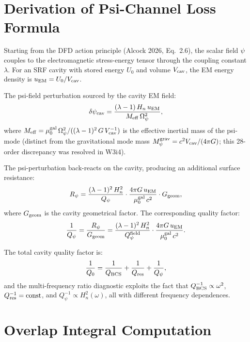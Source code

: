 \documentclass[11pt]{article}
\newcommand{\Meff}{M_{\rm eff}}
\newcommand{\Heff}{H_n}
\newcommand{\muG}{\mu_0^{\rm gal}}
\newcommand{\Vcav}{V_{\rm cav}}
\begin{document}
\newpage
\appendix

\section{Derivation of Psi-Channel Loss Formula}
\label{app:psi_loss}

Starting from the DFD action principle (Alcock 2026, Eq.~2.6), the
scalar field $\psi$ couples to the electromagnetic stress-energy tensor
through the coupling constant $\lambda$. For an SRF cavity with stored
energy $U_0$ and volume $\Vcav$, the EM energy density is
$u_{\rm EM} = U_0/\Vcav$.

The psi-field perturbation sourced by the cavity EM field:
\begin{equation}
\delta\psi_{\rm cav} = \frac{(\lambda-1)\,\Heff\,u_{\rm EM}}
{\Meff\,\Omega_\psi^2},
\end{equation}
where $\Meff = \muG\,\Omega_\psi^2/((\lambda-1)^2\,G\,\Vcav^{-1})$ is
the effective inertial mass of the psi-mode (distinct from the
gravitational mode mass $M_\psi^{\rm grav} = c^2\Vcav/(4\pi G)$; this
28-order discrepancy was resolved in W3i4).

The psi-perturbation back-reacts on the cavity, producing an additional
surface resistance:
\begin{equation}
R_\psi = \frac{(\lambda-1)^2\,\Heff^2}{Q_\psi}
\cdot\frac{4\pi G\,u_{\rm EM}}{\muG\,c^2}\cdot G_{\rm geom},
\end{equation}
where $G_{\rm geom}$ is the cavity geometrical factor. The corresponding
quality factor:
\begin{equation}
\frac{1}{Q_\psi} = \frac{R_\psi}{G_{\rm geom}} =
\frac{(\lambda-1)^2\,\Heff^2}{Q_\psi^{\rm field}}
\cdot\frac{4\pi G\,u_{\rm EM}}{\muG\,c^2}.
\end{equation}

The total cavity quality factor is:
\begin{equation}
\frac{1}{Q_0} = \frac{1}{Q_{\rm BCS}} + \frac{1}{Q_{\rm res}}
+ \frac{1}{Q_\psi},
\end{equation}
and the multi-frequency ratio diagnostic exploits the fact that
$Q_{\rm BCS}^{-1} \propto \omega^2$, $Q_{\rm res}^{-1} = \text{const}$,
and $Q_\psi^{-1} \propto \Heff^2(\omega)$, all with different frequency
dependences.


\section{Overlap Integral Computation}
\label{app:overlap}
\end{document}
